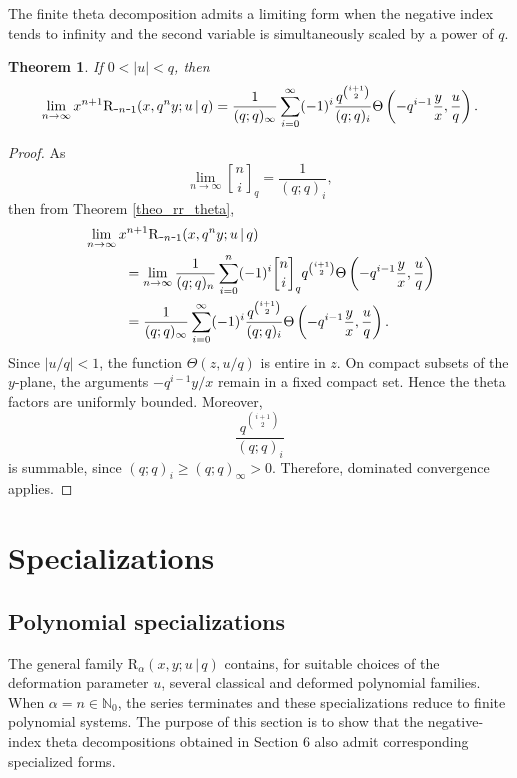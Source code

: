 \documentclass[12pt]{article}
\newcommand{\qbinom}{\genfrac{[}{]}{0pt}{}}
\newcommand{\minus}{\textup{\texttt{-}}}
\newcommand{\rr}{\mathrm{R}}
\newtheorem{theorem}{Theorem}
\begin{document}
The finite theta decomposition admits a limiting form when the negative index tends to infinity and the second variable is simultaneously scaled by a power of \(q\).
\begin{theorem}
If $0<\vert u\vert<q$, then
\begin{equation}
    \lim_{n\rightarrow\infty}x^{n+1}\rr_{\minus n\minus1}(x,q^ny;u\,|\,q)=\frac{1}{(q;q)_{\infty}}\sum_{i=0}^{\infty}(-1)^i\frac{q^{\binom{i+1}{2}}}{(q;q)_{i}}\Theta\left(-q^{i-1}\frac{y}{x},\frac{u}{q}\right).
\end{equation}
\end{theorem}
\begin{proof}
As
\begin{equation*}
    \lim_{n\rightarrow\infty}\qbinom{n}{i}_{q}=\frac{1}{(q;q)_{i}},
\end{equation*}
then from Theorem \ref{theo_rr_theta},
\begin{align*}
    &\lim_{n\rightarrow\infty}x^{n+1}\rr_{\minus n\minus1}(x,q^ny;u\,|\,q)\\
    &\hspace{1cm}=\lim_{n\rightarrow\infty}\frac{1}{(q;q)_{n}}\sum_{i=0}^{n}(-1)^i\qbinom{n}{i}_{q}q^{\binom{i+1}{2}}\Theta\left(-q^{i-1}\frac{y}{x},\frac{u}{q}\right)\\
    &\hspace{1cm}=\frac{1}{(q;q)_{\infty}}\sum_{i=0}^{\infty}(-1)^i\frac{q^{\binom{i+1}{2}}}{(q;q)_{i}}\Theta\left(-q^{i-1}\frac{y}{x},\frac{u}{q}\right).
\end{align*}  
Since \(|u/q|<1\), the function \(\Theta(z,u/q)\) is entire in \(z\). On compact subsets of the \(y\)-plane, the arguments \(-q^{i-1}y/x\) remain in a fixed compact set. Hence the theta factors are uniformly bounded. Moreover, \[ \frac{q^{\binom{i+1}{2}}}{(q;q)_i} \] is summable, since \((q;q)_i\ge (q;q)_\infty>0\). Therefore, dominated convergence applies.
\end{proof}


\section{Specializations}

\subsection{Polynomial specializations}

The general family \(\rr_{\alpha}(x,y;u\,|\,q)\) contains, for suitable choices of the deformation parameter \(u\), several classical and deformed polynomial families. When \(\alpha=n\in\mathbb N_0\), the series terminates and these specializations reduce to finite polynomial systems. The purpose of this section is to show that the negative-index theta decompositions obtained in Section 6 also admit corresponding specialized forms.
\end{document}
